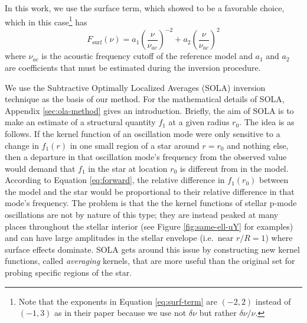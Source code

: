 \documentclass[twocolumn,twocolappendix]{aastex6}
\begin{document}
In this work, we use the \citet{2014A&A...568A.123B} surface term, which \citet{2015ApJ...808..123S} showed to be a favorable choice, which in this case\footnote{Note that the exponents in Equation \ref{eq:surf-term} are $(-2, 2)$ instead of $(-1, 3)$ as in their paper because we use not $\delta\nu$ but rather $\delta\nu/\nu$.} has
\begin{equation} \label{eq:surf-term}
    F_\text{surf}(\nu) 
    = 
    a_1 \left(\frac{\nu}{\nu_{ac}}\right)^{-2}%
  + a_2 \left(\frac{\nu}{\nu_{ac}}\right)^2%
\end{equation}
where $\nu_{ac}$ is the acoustic frequency cutoff of the reference model and $a_1$ and $a_2$ are coefficients that must be estimated during the inversion procedure. 




We use the Subtractive Optimally Localized Averages (SOLA) inversion technique as the basis of our method. For the mathematical details of SOLA, Appendix \ref{sec:ola-method} gives an introduction. %
Briefly, the aim of SOLA is to make an estimate of a structural quantity $f_1$ at a given radius $r_0$. 
The idea is as follows. 
If the kernel function of an oscillation mode were only sensitive to a change in $f_1(r)$ in one small region of a star around $r=r_0$ and nothing else, then a departure in that oscillation mode's frequency from the observed value would demand that $f_1$ in the star at location $r_0$ is different from in the model. 
According to Equation \ref{eq:forward}, the relative difference in $f_1(r_0)$ between the model and the star would be proportional to their relative difference in that mode's frequency. 
The problem is that the the kernel functions of stellar p-mode oscillations are not by nature of this type; they are instead peaked at many places throughout the stellar interior (see Figure \ref{fig:same-ell-uY} for examples) and can have large amplitudes in the stellar envelope (i.e.~near $r/R=1$) where surface effects dominate. 
SOLA gets around this issue by constructing new kernel functions, called \emph{averaging} kernels, that are more useful than the original set for probing specific regions of the star. 
\end{document}
